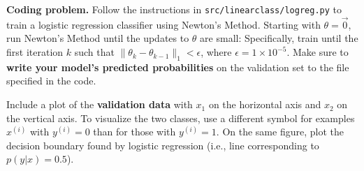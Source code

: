 \item {} \textbf{Coding problem.}
Follow the instructions in \texttt{src/linearclass/logreg.py} to train a
logistic regression classifier using Newton's Method.
Starting with $\theta = \vec{0}$, run Newton's Method until the updates to
$\theta$ are small: Specifically,  train until the first iteration $k$ such
that $\|\theta_{k} - \theta_{k-1}\|_1 < \epsilon$, where
$\epsilon = 1\times 10^{-5}$. Make sure to \textbf{write your model's predicted probabilities} on
the validation set to the file specified in the code.

Include a plot of the \textbf{validation data} with $x_1$ on the horizontal axis and $x_2$ on the vertical axis.
To visualize the two classes, use a different symbol for examples $x^{(i)}$
with $y^{(i)} = 0$ than for those with $y^{(i)} = 1$. On the same figure, plot the decision boundary
found by logistic regression (i.e., line corresponding to $p(y|x) = 0.5$).

